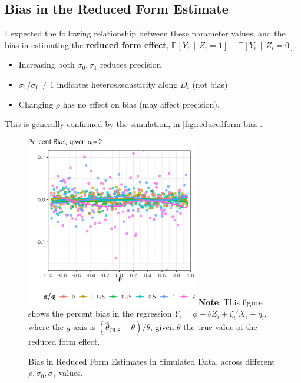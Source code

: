 \documentclass[a4paper, 12pt]{article}                                     %
\renewcommand{\vec}[1]{\boldsymbol{\mathit{#1}}}                           %
\newcommand{\Egiven}[3][]{\mathbb{E}_{#1} \left[ #2 \, \middle\vert \, #3 \right]} %
\renewcommand{\hat}[1]{\widehat{#1}}                                       %
\begin{document}
\subsection{Bias in the Reduced Form Estimate}
I expected the following relationship between these parameter values, and the bias in estimating the \textbf{reduced form effect}, $\Egiven{Y_i}{Z_i = 1} - \Egiven{Y_i}{Z_i = 0}$.
\begin{itemize}
    \item Increasing both $\sigma_0, \sigma_1$ reduces precision
    \item $\sigma_1 / \sigma_0 \neq 1$ indicates heteroskedasticity along $D_i$ (not bias)
    \item Changing $\rho$ has no effect on bias (may affect precision).
\end{itemize}
This is generally confirmed by the simulation, in \autoref{fig:reducedform-bias}.

\begin{figure}[H]
    \centering
    \singlespacing
    \caption{Bias in Reduced Form Estimates in Simulated Data, across different $\rho, \sigma_0, \sigma_1$ values.}
    \includegraphics[width=0.67\textwidth]{sim-output/reducedform-bias.png}
    \label{fig:reducedform-bias}
    \justify
    \footnotesize
    \textbf{Note}:
    This figure shows the percent bias in the regression $Y_i = \phi + \theta Z_i + \vec\zeta_i' \vec X_i +\eta_i$, where the $y$-axis is $( \hat\theta_{\text{OLS}} - \theta ) / \theta$, given $\theta$ the true value of the reduced form effect.
\end{figure}
\end{document}
